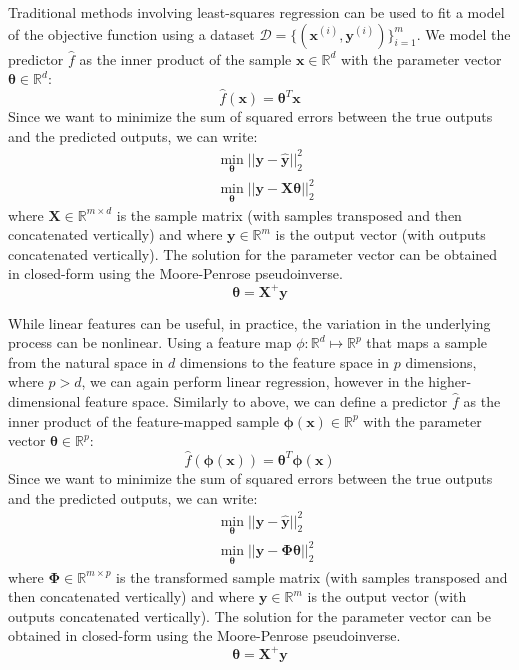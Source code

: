 \documentclass[conference]{IEEEtran}
\begin{document}
    Traditional methods involving least-squares regression can be used to fit a model of the objective function using a dataset $\mathcal{D} = \{ (\boldsymbol{x}^{(i)}, \boldsymbol{y}^{(i)}) \}_{i=1}^m$. We model the predictor $\hat f$ as the inner product of the sample $\boldsymbol x \in \mathbb{R}^d$ with the parameter vector $\boldsymbol \theta \in \mathbb{R}^d$:
    \begin{equation}
        \hat f(\boldsymbol x) = \boldsymbol \theta ^T \boldsymbol x
    \end{equation}
	Since we want to minimize the sum of squared errors between the true outputs and the predicted outputs, we can write:
	\begin{align}
	    & \min_{\boldsymbol \theta} || \boldsymbol{y} - \boldsymbol{\hat{y}} ||_2^2 \\ 
	    & \min_{\boldsymbol \theta} || \boldsymbol{y} - \boldsymbol{X \theta} ||_2^2
	\end{align}
	where $\boldsymbol X \in \mathbb{R}^{m \times d}$ is the sample matrix (with samples transposed and then concatenated vertically) and where $\boldsymbol y \in \mathbb{R}^m$ is the output vector (with outputs concatenated vertically). The solution for the parameter vector can be obtained in closed-form using the Moore-Penrose pseudoinverse.
	\begin{equation}
	    \boldsymbol{\theta} = \boldsymbol{X}^+ \boldsymbol{y}
	\end{equation}
	
	While linear features can be useful, in practice, the variation in the underlying process can be nonlinear. Using a feature map $\phi: \mathbb{R}^d \mapsto \mathbb{R}^p$ that maps a sample from the natural space in $d$ dimensions to the feature space in $p$ dimensions, where $p > d$, we can again perform linear regression, however in the higher-dimensional feature space. Similarly to above, we can define a predictor $\hat f$ as the inner product of the feature-mapped sample $\boldsymbol{\phi(x)} \in \mathbb{R}^p$ with the parameter vector $\boldsymbol{\theta} \in \mathbb{R}^p$:
    \begin{equation}
        \hat f(\boldsymbol{\phi(x)}) = \boldsymbol{\theta}^T \boldsymbol{\phi(x)}
    \end{equation}
	Since we want to minimize the sum of squared errors between the true outputs and the predicted outputs, we can write:
	\begin{align}
	    & \min_{\boldsymbol \theta} || \boldsymbol{y} - \boldsymbol{\hat{y}} ||_2^2 \\ 
	    & \min_{\boldsymbol \theta} || \boldsymbol{y} - \boldsymbol{\Phi \theta} ||_2^2
	\end{align}
	where $\boldsymbol \Phi \in \mathbb{R}^{m \times p}$ is the transformed sample matrix (with samples transposed and then concatenated vertically) and where $\boldsymbol y \in \mathbb{R}^m$ is the output vector (with outputs concatenated vertically). The solution for the parameter vector can be obtained in closed-form using the Moore-Penrose pseudoinverse.
	\begin{equation}
	    \boldsymbol{\theta} = \boldsymbol{X}^+ \boldsymbol{y}
	\end{equation}
	
\end{document}
